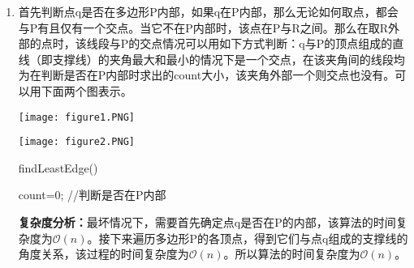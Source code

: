 \documentclass[12pt,a4paper]{article}
\makeatletter
\newtheorem*{solution}{Solution}
\theoremstyle{definition}
\renewenvironment{solution}[1][Solution] {\par\pushQED{\qed}\normalfont\topsep6\p@\@plus6\p@\relax\trivlist\item[\hskip\labelsep\bfseries#1\@addpunct{.}]\ignorespaces}{\popQED\endtrivlist\@endpefalse} \makeatother
\makeatother
\begin{document}
\begin{enumerate}
\begin{solution}
	首先判断点q是否在多边形P内部，如果q在P内部，那么无论如何取点，都会与P有且仅有一个交点。当它不在P内部时，该点在P与R之间。那么在取R外部的点时，该线段与P的交点情况可以用如下方式判断：q与P的顶点组成的直线（即支撑线）的夹角最大和最小的情况下是一个交点，在该夹角间的线段均为在判断是否在P内部时求出的count大小，该夹角外部一个则交点也没有。可以用下面两个图表示。
	\begin{center}
		\texttt{[image: figure1.PNG]}
	\end{center}
	\begin{center}
		\texttt{[image: figure2.PNG]}
	\end{center}
	\begin{algorithm}
		\caption{findLeastEdge()}
		count=0;
		//判断是否在P内部\\
	\end{algorithm}
	\textbf{复杂度分析：}最坏情况下，需要首先确定点q是否在P的内部，该算法的时间复杂度为$\mathcal{O}(n)$。接下来遍历多边形P的各顶点，得到它们与点q组成的支撑线的角度关系，该过程的时间复杂度为$\mathcal{O}(n)$。所以算法的时间复杂度为$\mathcal{O}(n)$。
\end{solution}


\end{enumerate}
\end{document}
